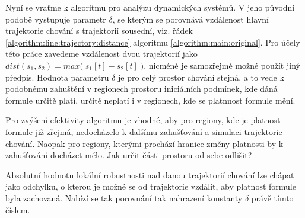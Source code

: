 Nyní se vraťme k algoritmu pro analýzu dynamických systémů. V jeho původní podobě
vystupuje parametr $\delta$, se kterým se porovnává vzdálenost hlavní trajektorie chování
s trajektorií sousední, viz. řádek \ref{algorithm:line:trajectory:distance}
algoritmu \ref{algorithm:main:original}. Pro účely této práce zavedeme
vzdálenost dvou trajektorií jako $dist(s_1, s_2) = max\Big(\big|s_1[t]-s_2[t]\big|\Big)$,
nicméně je samozřejmě možné použít jiný předpis. Hodnota parametru $\delta$ je pro celý prostor
chování stejná, a to vede k podobnému zahuštění v regionech prostoru iniciálních podmínek,
kde dáná formule určitě platí, určitě neplatí i v regionech, kde se platnnost formule mění.

Pro zvýšení efektivity algoritmu je vhodné, aby pro regiony, kde je platnost formule již zřejmá,
nedocházelo k dalšímu zahušťování a simulaci trajektorie chování. Naopak pro regiony, kterými prochází
hranice změny platnosti by k zahušťování docházet mělo. Jak určit části prostoru od sebe odlišit?

Absolutní hodnotu lokální robustnosti nad danou trajektorií chování lze chápat
jako odchylku, o kterou je možné se od trajektorie vzdálit, aby platnost
formule byla zachovaná. Nabízí se tak porovnání tak nahrazení konstanty $\delta$ 
právě tímto číslem.

